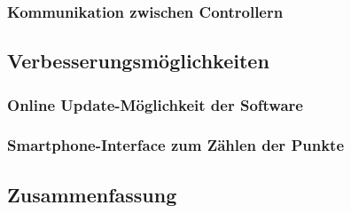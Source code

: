 \subsubsection{Kommunikation zwischen Controllern}
\subsection{Verbesserungsmöglichkeiten}
\subsubsection{Online Update-Möglichkeit der Software}
\subsubsection{Smartphone-Interface zum Zählen der Punkte}
\subsection{Zusammenfassung}